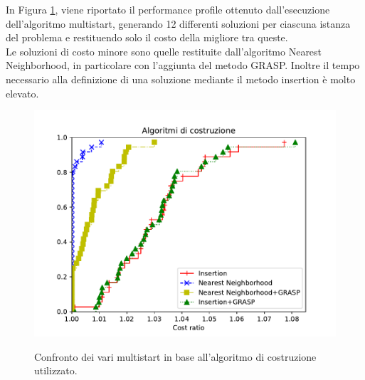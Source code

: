 In Figura \ref{pp_construction}, viene riportato il performance profile ottenuto dall'esecuzione dell'algoritmo multistart, generando 12 differenti soluzioni per ciascuna istanza del problema e restituendo solo il costo della migliore tra queste.\\
Le soluzioni di costo minore sono quelle restituite dall'algoritmo Nearest Neighborhood, in particolare con l'aggiunta del metodo GRASP. 
Inoltre il tempo necessario alla definizione di una soluzione mediante il metodo insertion è molto elevato. 
\begin{figure}[h] 
\begin{center} 
  \includegraphics[scale=0.8]{Images/pp_construction}\\ 
  \caption{\footnotesize{Confronto dei vari multistart in base all'algoritmo di costruzione utilizzato.}}
  \label{pp_construction} 
\end{center} 
\end{figure}
